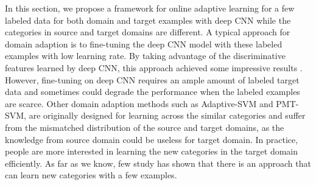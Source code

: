 ﻿In this section, we propose a framework for online adaptive learning for a few labeled data for both domain and target examples with deep CNN while the categories in source and target domains are different. A typical approach for domain adaption is to fine-tuning the deep CNN model with these labeled examples with low learning rate. By taking advantage of the discriminative features learned by deep CNN, this approach achieved some impressive results\cite{Chatfield14} \cite{zeiler2014visualizing}. However, fine-tuning on deep CNN requires an ample amount of labeled target data and sometimes could degrade the performance when the labeled examples are scarce\cite{hoffman2013one}. Other domain adaption methods such as Adaptive-SVM and PMT-SVM, are originally designed for learning across the similar categories and suffer from the mismatched distribution of the source and target domains, as the knowledge from source domain could be useless for target domain. In practice, people are more interested in learning the new categories in the target domain efficiently.
 As far as we know, few study has shown that there is an approach that can learn new categories with a few examples.

